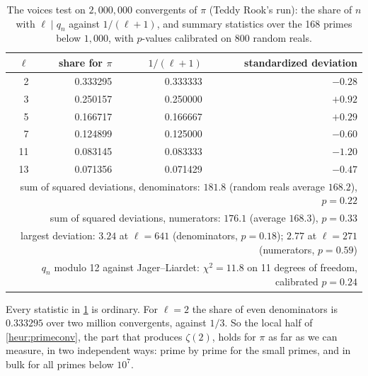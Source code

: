 \begin{table}[t]
\centering
\caption[The voices test on two million convergents of $\pi$]{The voices test on $2{,}000{,}000$ convergents of $\pi$ (Teddy Rook's run): the share of $n$ with $\ell \mid q_n$ against $1/(\ell + 1)$, and summary statistics over the 168 primes below $1{,}000$, with $p$-values calibrated on 800 random reals.}
\label{tab:th-voices}
\small
\begin{tabular}{rrrr}
\toprule
$\ell$ & share for $\pi$ & $1/(\ell + 1)$ & standardized deviation \\
\midrule
2 & 0.333295 & 0.333333 & $-0.28$ \\
3 & 0.250157 & 0.250000 & $+0.92$ \\
5 & 0.166717 & 0.166667 & $+0.29$ \\
7 & 0.124899 & 0.125000 & $-0.60$ \\
11 & 0.083145 & 0.083333 & $-1.20$ \\
13 & 0.071356 & 0.071429 & $-0.47$ \\
\midrule
\multicolumn{4}{p{0.8\textwidth}}{sum of squared deviations, denominators: $181.8$ (random reals average $168.2$), $p = 0.22$} \\
\multicolumn{4}{p{0.8\textwidth}}{sum of squared deviations, numerators: $176.1$ (average $168.3$), $p = 0.33$} \\
\multicolumn{4}{p{0.8\textwidth}}{largest deviation: $3.24$ at $\ell = 641$ (denominators, $p = 0.18$); $2.77$ at $\ell = 271$ (numerators, $p = 0.59$)} \\
\multicolumn{4}{p{0.8\textwidth}}{$q_n$ modulo 12 against Jager--Liardet: $\chi^2 = 11.8$ on 11 degrees of freedom, calibrated $p = 0.24$} \\
\bottomrule
\end{tabular}
\end{table}

Every statistic in \cref{tab:th-voices} is ordinary. For $\ell = 2$ the share of even denominators is $0.333295$ over two million convergents, against $1/3$. So the local half of \cref{heur:primeconv}, the part that produces $\zeta(2)$, holds for $\pi$ as far as we can measure, in two independent ways: prime by prime for the small primes, and in bulk for all primes below $10^7$.

